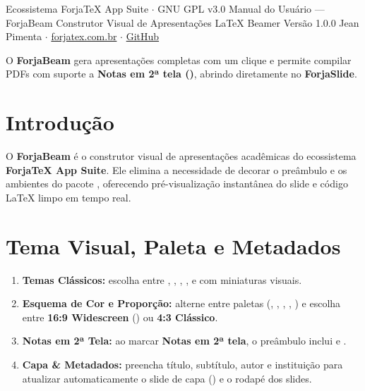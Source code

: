 \documentclass[11pt,a4paper]{article}
\begin{document}
  {Ecossistema ForjaTeX App Suite $\cdot$ GNU GPL v3.0}
  {Manual do Usuário --- ForjaBeam}
  {Construtor Visual de Apresentações \LaTeX{} Beamer}
  {Versão 1.0.0}
  {Jean Pimenta $\cdot$ \href{https://forjatex.com.br}{\color{fjsky}forjatex.com.br} $\cdot$ \href{https://github.com/jeanjpimenta/forjatex-suite}{\color{fjsky}GitHub}}


\begin{fjcallout}
O \textbf{ForjaBeam} gera apresentações  completas com um clique e permite compilar PDFs com suporte a \textbf{Notas em 2ª tela ()}, abrindo diretamente no \textbf{ForjaSlide}.
\end{fjcallout}

\section{Introdução}
O \textbf{ForjaBeam} é o construtor visual de apresentações acadêmicas do ecossistema \textbf{ForjaTeX App Suite}. Ele elimina a necessidade de decorar o preâmbulo e os ambientes do pacote , oferecendo pré-visualização instantânea do slide e código \LaTeX{} limpo em tempo real.

\section{Tema Visual, Paleta e Metadados}
\begin{enumerate}
  \item \textbf{Temas Clássicos:} escolha entre , , , ,  e  com miniaturas visuais.
  \item \textbf{Esquema de Cor e Proporção:} alterne entre paletas (, , , , ) e escolha entre \textbf{16:9 Widescreen} () ou \textbf{4:3 Clássico}.
  \item \textbf{Notas em 2ª Tela:} ao marcar \textbf{Notas em 2ª tela}, o preâmbulo inclui  e .
  \item \textbf{Capa \& Metadados:} preencha título, subtítulo, autor e instituição para atualizar automaticamente o slide de capa () e o rodapé dos slides.
\end{enumerate}
\end{document}
